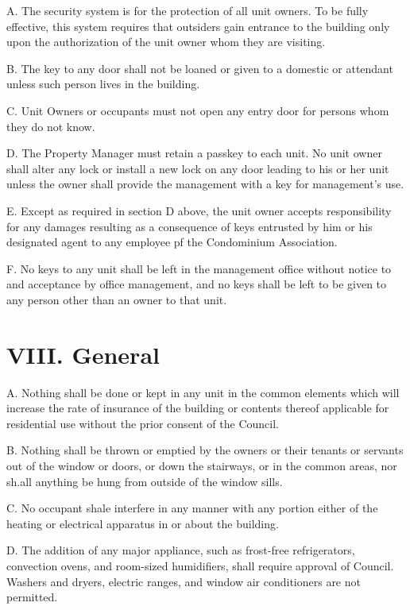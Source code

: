 \documentclass[
]{book}
\begin{document}
A. The security system is for the protection of all unit owners. To be fully effective, this system requires that outsiders gain entrance to the building only upon the authorization of the unit owner whom they are visiting.

B. The key to any door shall not be loaned or given to a domestic or attendant unless such person lives in the building.

C. Unit Owners or occupants must not open any entry door for persons whom they do not know.

D. The Property Manager must retain a passkey to each unit. No unit owner shall alter any lock or install a new lock on any door leading to his or her unit unless the owner shall provide the management with a key for management's use.

E. Except as required in section D above, the unit owner accepts responsibility for any damages resulting as a consequence of keys entrusted by him or his designated agent to any employee pf the Condominium Association.

F. No keys to any unit shall be left in the management office without notice to and acceptance by office management, and no keys shall be left to be given to any person other than an owner to that unit.

\hypertarget{viii.-general-1}{%
\section*{VIII. General}\label{viii.-general-1}}

A. Nothing shall be done or kept in any unit in the common elements which will increase the rate of insurance of the building or contents thereof applicable for residential use without the prior consent of the Council.

B. Nothing shall be thrown or emptied by the owners or their tenants or servants out of the window or doors, or down the stairways, or in the common areas, nor sh.all anything be hung from outside of the window sills.

C. No occupant shale interfere in any manner with any portion either of the heating or electrical apparatus in or about the building.

D. The addition of any major appliance, such as frost-free refrigerators, convection ovens, and room-sized humidifiers, shall require approval of Council. Washers and dryers, electric ranges, and window air conditioners are not permitted.
\end{document}
